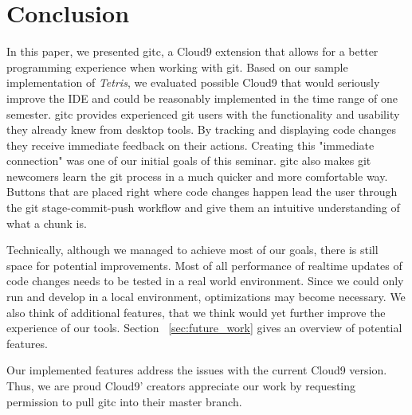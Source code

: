 \section{Conclusion}
\label{sec:Conclusion}

In this paper, we presented gitc, a Cloud9 extension that allows for a better programming experience when working with git. 
Based on our sample implementation of \textit{Tetris}, we evaluated possible Cloud9 that would seriously improve the IDE and could be reasonably implemented in the time range of one semester. 
gitc provides experienced git users with the functionality and usability they already knew from desktop tools. 
By tracking and displaying code changes they receive immediate feedback on their actions. 
Creating this "immediate connection" was one of our initial goals of this seminar. 
gitc also makes git newcomers learn the git process in a much quicker and more comfortable way. Buttons that are placed right where code changes happen lead the user through the git stage-commit-push workflow and give them an intuitive understanding of what a chunk is.

Technically, although we managed to achieve most of our goals, there is still space for potential improvements. 
Most of all performance of realtime updates of code changes needs to be tested in a real world environment. 
Since we could only run and develop in a local environment, optimizations may become necessary. 
We also think of additional features, that we think would yet further improve the experience of our tools. 
Section ~\ref{sec:future_work} gives an overview of potential features.

Our implemented features address the issues with the current Cloud9 version. 
Thus, we are proud Cloud9' creators appreciate our work by requesting permission to pull gitc into their master branch.
